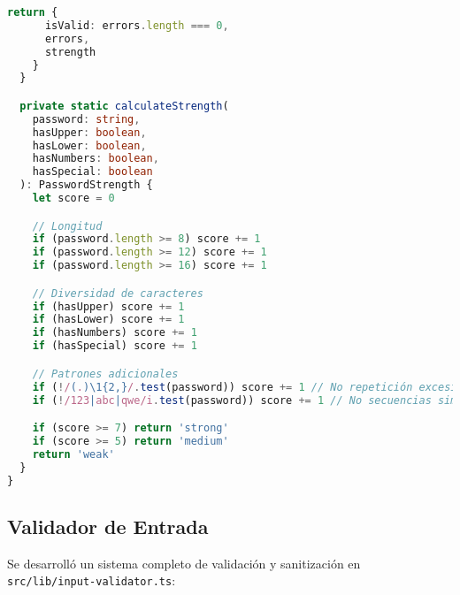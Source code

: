 \documentclass[12pt,a4paper]{article}
\begin{document}
\begin{lstlisting}[language=TypeScript, caption=Validador de Contraseñas]
    return {
      isValid: errors.length === 0,
      errors,
      strength
    }
  }

  private static calculateStrength(
    password: string,
    hasUpper: boolean,
    hasLower: boolean,
    hasNumbers: boolean,
    hasSpecial: boolean
  ): PasswordStrength {
    let score = 0

    // Longitud
    if (password.length >= 8) score += 1
    if (password.length >= 12) score += 1
    if (password.length >= 16) score += 1

    // Diversidad de caracteres
    if (hasUpper) score += 1
    if (hasLower) score += 1
    if (hasNumbers) score += 1
    if (hasSpecial) score += 1

    // Patrones adicionales
    if (!/(.)\1{2,}/.test(password)) score += 1 // No repetición excesiva
    if (!/123|abc|qwe/i.test(password)) score += 1 // No secuencias simples

    if (score >= 7) return 'strong'
    if (score >= 5) return 'medium'
    return 'weak'
  }
}
\end{lstlisting}

\subsection{Validador de Entrada}

Se desarrolló un sistema completo de validación y sanitización en \texttt{src/lib/input-validator.ts}:
\end{document}
